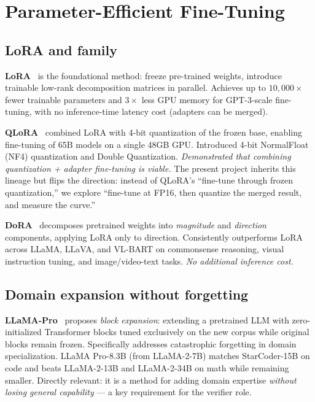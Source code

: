 \documentclass[11pt]{article}
\begin{document}
\section{Parameter-Efficient Fine-Tuning}

\subsection{LoRA and family}

\textbf{LoRA}~\cite{hu2021lora} is the foundational method: freeze pre-trained weights, introduce trainable low-rank decomposition matrices in parallel. Achieves up to $10{,}000\times$ fewer trainable parameters and $3\times$ less GPU memory for GPT-3-scale fine-tuning, with no inference-time latency cost (adapters can be merged).

\textbf{QLoRA}~\cite{dettmers2023qlora} combined LoRA with 4-bit quantization of the frozen base, enabling fine-tuning of 65B models on a single 48GB GPU. Introduced 4-bit NormalFloat (NF4) quantization and Double Quantization. \emph{Demonstrated that combining quantization + adapter fine-tuning is viable.} The present project inherits this lineage but flips the direction: instead of QLoRA's ``fine-tune through frozen quantization,'' we explore ``fine-tune at FP16, then quantize the merged result, and measure the curve.''

\textbf{DoRA}~\cite{liu2024dora} decomposes pretrained weights into \emph{magnitude} and \emph{direction} components, applying LoRA only to direction. Consistently outperforms LoRA across LLaMA, LLaVA, and VL-BART on commonsense reasoning, visual instruction tuning, and image/video-text tasks. \emph{No additional inference cost.}

\subsection{Domain expansion without forgetting}

\textbf{LLaMA-Pro}~\cite{wu2024llamapro} proposes \emph{block expansion}: extending a pretrained LLM with zero-initialized Transformer blocks tuned exclusively on the new corpus while original blocks remain frozen. Specifically addresses catastrophic forgetting in domain specialization. LLaMA Pro-8.3B (from LLaMA-2-7B) matches StarCoder-15B on code and beats LLaMA-2-13B and LLaMA-2-34B on math while remaining smaller. Directly relevant: it is a method for adding domain expertise \emph{without losing general capability} --- a key requirement for the verifier role.
\end{document}
